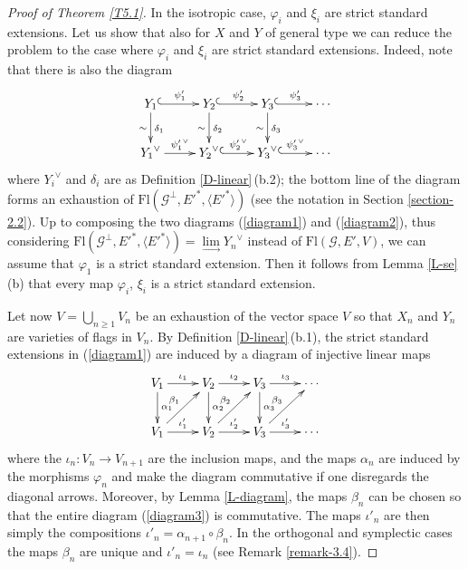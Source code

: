 \documentclass[12pt]{amsart}
\theoremstyle{definition}
\begin{document}
\begin{proof}[Proof of Theorem \ref{T5.1}]
In the isotropic case, $\varphi_i$ and $\xi_i$ are strict standard extensions. Let us show that also for $X$ and $Y$ of general type we can reduce the problem to the case where $\varphi_i$ and $\xi_i$ are strict standard extensions. 
Indeed, note that there is also the diagram
\begin{equation}
\label{diagram2}
\xymatrix{%
Y_1  \ar@{^{(}->}[r]^{\psi'_1} %
\ar[d]_\sim^{\delta_1} & Y_2 \ar@{^{(}->}[r]^{\psi'_2} %
\ar[d]_\sim^{\delta_2} & Y_3 \ar@{^{(}->}[r]^{\psi'_3} %
\ar[d]_\sim^{\delta_3} & \cdots \\
{Y_1}^\vee \ar[r]^{{\psi'_1}^\vee} & {Y_2}^\vee \ar@{^{(}->}[r]^{{\psi'_2}^\vee} & {Y_3}^\vee \ar@{^{(}->}[r]^{{\psi'_3}^\vee} & \cdots}
\end{equation}
where ${Y_i}^\vee$ and $\delta_i$ are as Definition \ref{D-linear}\,(b.2); the bottom line of the diagram forms an exhaustion of $\mathrm{Fl}(\mathcal{G}^\perp,E'^*,\langle E'^*\rangle)$ (see the notation in Section \ref{section-2.2}).
Up to composing the two diagrams (\ref{diagram1}) and (\ref{diagram2}), thus considering $\mathrm{Fl}(\mathcal{G}^\perp,E'^*,\langle E'^*\rangle)=\lim\limits_\to{Y_n}^\vee$ instead of $\mathrm{Fl}(\mathcal{G},E',V)$, we can assume that $\varphi_1$ is a strict standard extension. Then it follows from Lemma \ref{L-se}\,(b) that every map $\varphi_i$, $\xi_i$ is a strict standard extension.

Let now $V=\bigcup_{n\geq 1}V_n$ be an exhaustion of the vector space $V$ so that $X_n$ and $Y_n$ are varieties of flags in $V_n$.
By Definition \ref{D-linear}\,(b.1), the strict standard extensions in (\ref{diagram1}) are induced by a diagram of injective linear maps
\begin{equation}
\label{diagram3}
\xymatrix{V_1 \ar[r]^{\iota_1} \ar[d]^{\alpha_1} & V_2 \ar[r]^{\iota_2} \ar[d]^{\alpha_2} & V_3 \ar[r]^{\iota_3} \ar[d]^{\alpha_3} & \cdots \\
V_1  \ar[r]^{\iota'_1} \ar[ru]^{\beta_1} & V_2 \ar[r]^{\iota'_2} \ar[ru]^{\beta_2} & V_3 \ar[r]^{\iota'_3} \ar[ru]^{\beta_3} & \cdots }
\end{equation}
where the $\iota_n:V_n\to V_{n+1}$ are the inclusion maps, and the maps $\alpha_n$ are induced by the morphisms $\varphi_n$ and make the diagram commutative if one disregards the diagonal arrows. Moreover, by Lemma \ref{L-diagram},
the maps $\beta_n$ can be chosen so that the entire diagram (\ref{diagram3}) is commutative. The maps $\iota'_n$ are then simply the compositions $\iota'_n=\alpha_{n+1}\circ\beta_n$.
In the orthogonal and symplectic cases the maps $\beta_n$ are unique and $\iota'_n=\iota_n$ (see Remark \ref{remark-3.4}).




\end{proof}
\end{document}

